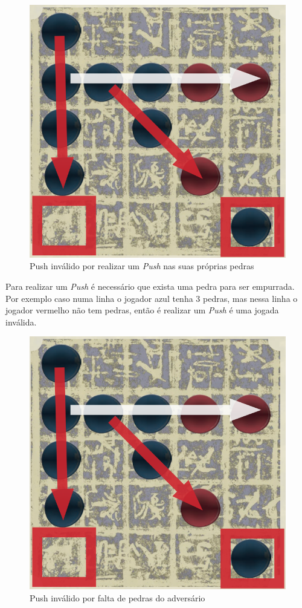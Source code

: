 \documentclass[a4paper]{article}
\begin{document}
\begin{figure}[!htb]
\centering
\includegraphics[scale=0.3]{push2.png} 
\caption{Push inválido por realizar um \textit{Push} nas suas próprias pedras}
\end{figure}

Para realizar um \textit{Push} é necessário que exista uma pedra para ser empurrada. Por exemplo caso numa linha o jogador azul tenha 3 pedras, mas nessa linha o jogador vermelho não tem pedras, então é realizar um  \textit{Push} é uma jogada inválida.

\begin{figure}[!htb]
\centering
\includegraphics[scale=0.3]{push2.png} 
\caption{Push inválido por falta de pedras do adversário}
\end{figure}
\end{document}
